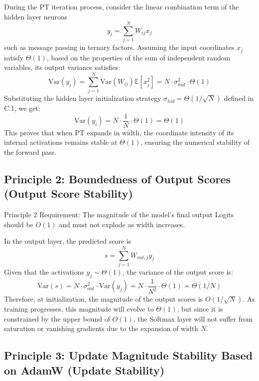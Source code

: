 \documentclass[11pt]{article}
\begin{document}
During the PT iteration process, consider the linear combination term of the hidden layer neurons 
\begin{equation}
    y_i = \sum_{j=1}^N W_{ij} x_j
\end{equation}
such as message passing in ternary factors. Assuming the input coordinates $x_j$ satisfy $\Theta(1)$, based on the properties of the sum of independent random variables, its output variance satisfies:
\begin{equation}
\text{Var}(y_i) = \sum_{j=1}^N \text{Var}(W_{ij}) \mathbb{E}[x_j^2] = N \cdot \sigma_{hid}^2 \cdot \Theta(1)
\end{equation}
Substituting the hidden layer initialization strategy $\sigma_{hid} = \Theta(1/\sqrt{N})$ defined in C.1, we get:
\begin{equation}
\text{Var}(y_i) = N \cdot \frac{1}{N} \cdot \Theta(1) = \Theta(1)
\end{equation}
This proves that when PT expands in width, the coordinate intensity of its internal activations remains stable at $\Theta(1)$, ensuring the numerical stability of the forward pass.


\subsection{Principle 2: Boundedness of Output Scores (Output Score Stability)}

Principle 2 Requirement: The magnitude of the model's final output Logits should be $O(1)$ and must not explode as width increases.

In the output layer, the predicted score is 
\begin{equation}
    s = \sum_{j=1}^N W_{out, j} y_j
\end{equation}
Given that the activations $y_j \sim \Theta(1)$, the variance of the output score is:
\begin{equation}
\text{Var}(s) = N \cdot \sigma_{out}^2 \cdot \text{Var}(y_j) = N \cdot \frac{1}{N^2} \cdot \Theta(1) = \Theta(1/N)
\end{equation}
Therefore, at initialization, the magnitude of the output scores is $O(1/\sqrt{N})$. As training progresses, this magnitude will evolve to $\Theta(1)$, but since it is constrained by the upper bound of $O(1)$, the Softmax layer will not suffer from saturation or vanishing gradients due to the expansion of width $N$.

\subsection{Principle 3: Update Magnitude Stability Based on AdamW (Update Stability)}
\end{document}
